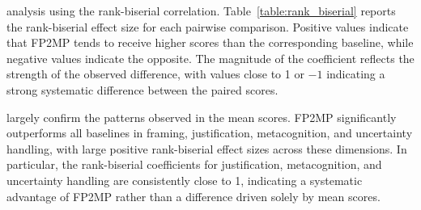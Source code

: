  analysis using the rank-biserial correlation.
Table~\ref{table:rank_biserial} reports the rank-biserial effect size for each pairwise comparison.
Positive values indicate that FP2MP tends to receive higher scores than the corresponding baseline, while negative values indicate the opposite.
The magnitude of the coefficient reflects the strength of the observed difference, with values close to 1 or $-1$ indicating a strong systematic difference between the paired scores.

\begin{table}[h]
\centering
\small
{}
\caption{
 for pairwise comparisons between FP2MP and baseline methods across evaluation criteria.
Positive values indicate higher scores for FP2MP, while negative values indicate higher scores for the corresponding baseline.
}
\label{table:rank_biserial}
\end{table}

 largely confirm the patterns observed in the mean scores.
FP2MP significantly outperforms all baselines in framing, justification, metacognition, and uncertainty handling, with large positive rank-biserial effect sizes across these dimensions.
In particular, the rank-biserial coefficients for justification, metacognition, and uncertainty handling are consistently close to 1, indicating a systematic advantage of FP2MP rather than a difference driven solely by mean scores.

